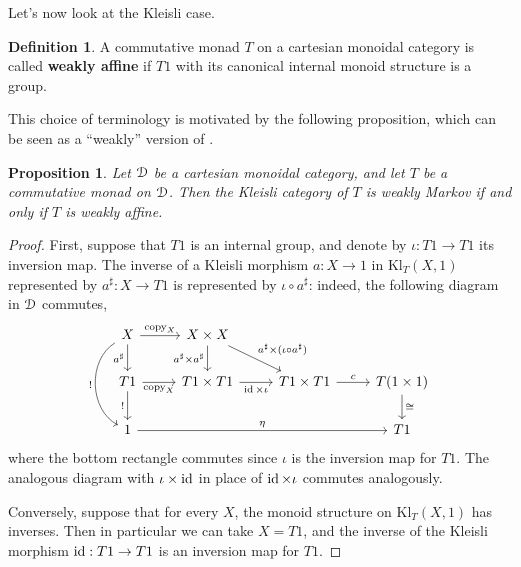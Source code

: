 \documentclass[a4paper,UKenglish,numberwithinsect,cleveref, autoref, thm-restate]{lipics-v2021}
\theoremstyle{plain} %
\newtheorem{myproposition}[mytheorem]{Proposition}
\theoremstyle{definition} %
\newtheorem{mydefinition}[mytheorem]{Definition}
\begin{document}



Let's now look at the Kleisli case.

\begin{mydefinition}
 A commutative monad $T$ on a cartesian monoidal category is called \textbf{weakly affine} if $T1$ with its canonical internal monoid structure is a group.
\end{mydefinition}

This choice of terminology is motivated by the following proposition, which can be seen as a ``weakly'' version of .

\begin{myproposition}\label{weaklyboth}
 Let $\mathcal{D}$ be a cartesian monoidal category, and let $T$ be a commutative monad on $\mathcal{D}$. Then the Kleisli category of $T$ is weakly Markov if and only if $T$ is weakly affine.
\end{myproposition}
\begin{proof}
 First, suppose that $T1$ is an internal group, and denote by $\iota:T1\to T1$ its inversion map. 
 The inverse of a Kleisli morphism $a : X \to 1$ in $\mathrm{Kl}_T(X,1)$ represented by $a^\sharp:X\to T1$ is represented by $\iota\circ a^\sharp$: indeed, the following diagram in $\mathcal{D}$ commutes,
 \[
  \begin{tikzcd}
  X \ar[bend right=5pc]{dd}[swap]{!} \ar{d}[swap]{a^\sharp} \ar{r}{\mathrm{copy}_X} & X\times X \ar{d}[swap]{a^\sharp\times a^\sharp} \ar{dr}{a^\sharp\times(\iota\circ a^\sharp)} \\
  T1 \ar{d}[swap]{!} \ar{r}[swap]{\mathrm{copy}_X} & T1\times T1 \ar{r}[swap]{\id\times\iota} & T1\times T1 \ar{r}{c} & T(1\times 1) \ar{d}{\cong} \\
  1 \ar{rrr}{\eta} &&& T1
  \end{tikzcd}
 \]
 where the bottom rectangle commutes since $\iota$ is the inversion map for $T1$. The analogous diagram with $\iota\times\operatorname{ id}$ in place of $\operatorname{ id}\times\iota$ commutes analogously.
 
 Conversely, suppose that for every $X$, the monoid structure on $\mathrm{Kl}_T(X,1)$ has inverses. Then in particular we can take $X=T1$, and the inverse of the Kleisli morphism $\operatorname{ id}:T1\to T1$ is an inversion map for $T1$. 
\end{proof}
\end{document}
